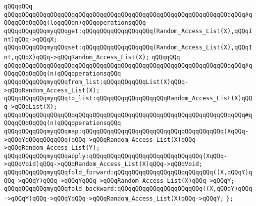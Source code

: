 \verb|qQQqqQQq|\newline
\verb|qQQqqQQqqQQqqQQqqQQqqQQqqQQqqQQqqQQqqQQqqQQqqQQqqQQqqQQqqQQqqQQqqQQq#qQQqqQQqOqQQq(logqQQqn)qQQqoperationsqQQq|\newline
\verb|qQQqqQQqqQQqmyqQQqget:qQQqqQQqqQQqqQQqqQQq(Random_Access_List(X),qQQqInt)qQQq->qQQqX;|\newline
\verb|qQQqqQQqqQQqmyqQQqset:qQQqqQQqqQQqqQQqqQQq(Random_Access_List(X),qQQqInt,qQQqX)qQQq->qQQqRandom_Access_List(X);|\newline
\verb|qQQqqQQq|\newline
\verb|qQQqqQQqqQQqqQQqqQQqqQQqqQQqqQQqqQQqqQQqqQQqqQQqqQQqqQQqqQQqqQQqqQQq#qQQqqQQqOqQQq(n)qQQqoperationsqQQq|\newline
\verb|qQQqqQQqqQQqmyqQQqfrom_list:qQQqqQQqqQQqList(X)qQQq->qQQqRandom_Access_List(X);|\newline
\verb|qQQqqQQqqQQqmyqQQqto_list:qQQqqQQqqQQqqQQqqQQqRandom_Access_List(X)qQQq->qQQqList(X);|\newline
\newline
\verb|qQQqqQQqqQQqqQQqqQQqqQQqqQQqqQQqqQQqqQQqqQQqqQQqqQQqqQQqqQQqqQQqqQQq#qQQqqQQqOqQQq(n)qQQqoperationsqQQq|\newline
\verb|qQQqqQQqqQQqmyqQQqmap:qQQqqQQqqQQqqQQqqQQqqQQqqQQqqQQqqQQqqQQq(XqQQq->qQQqYqQQqqQQqqQQq)qQQq->qQQqRandom_Access_List(X)qQQq->qQQqRandom_Access_List(Y);|\newline
\verb|qQQqqQQqqQQqmyqQQqapply:qQQqqQQqqQQqqQQqqQQqqQQqqQQqqQQq(XqQQq->qQQqVoid)qQQq->qQQqRandom_Access_List(X)qQQq->qQQqVoid;|\newline
\newline
\verb|qQQqqQQqqQQqmyqQQqfold_forward:qQQqqQQqqQQqqQQqqQQqqQQqqQQq((X,qQQqY)qQQq->qQQqY)qQQq->qQQqYqQQq->qQQqRandom_Access_List(X)qQQq->qQQqY;|\newline
\verb|qQQqqQQqqQQqmyqQQqfold_backward:qQQqqQQqqQQqqQQqqQQqqQQq((X,qQQqY)qQQq->qQQqY)qQQq->qQQqYqQQq->qQQqRandom_Access_List(X)qQQq->qQQqY;|\newline
\newline
\verb|};|\newline
\newline

